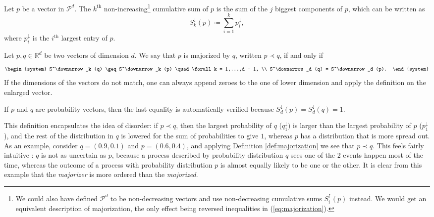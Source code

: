 \begin{definition}[Cumulative sum] %
    Let $p$ be a vector in $\mathcal{P}^d$. The $k^{\text{th}}$ non-increasing\footnote{We could also have defined $\mathcal{P}^d$ to be non-decreasing vectors and use non-decreasing cumulative sums $S^\uparrow_i (p)$ instead. We would get an equivalent description of majorization, the only effect being reversed inequalities in (\ref{eq:majorization}).} cumulative sum of $p$ is the sum of the $j$ biggest components of $p$, which can be written as
    \begin{equation}
        S^\downarrow_k (p) \coloneqq \sum_{i = 1}^{k} p^\downarrow_i,
    \end{equation}
    where $p^\downarrow_i$ is the $i^{\text{th}}$ largest entry of $p$. 

\end{definition}
\begin{definition} \label{def:majorization}
    Let $p, q \in \mathbb{R}^d$ be two vectors of dimension $d$. We say that $p$ is majorized by $q$, written $p \prec q$, if and only if
    \begin{equation} \label{eq:majorization}
        \begin{system}
            S^\downarrow_k (q) \geq S^\downarrow_k (p) \quad \forall k = 1,...,d - 1, \\
            S^\downarrow_d (q) = S^\downarrow_d (p).
        \end{system}
    \end{equation}
If the dimensions of the vectors do not match, one can always append zeroes to the one of lower dimension and apply the definition on the enlarged vector.
\end{definition}

\begin{remark}
    If $p$ and $q$ are probability vectors, then the last equality is automatically verified because $S^\downarrow_d (p) = S^\downarrow_d (q) = 1$.
\end{remark}

This definition encapsulates the idea of disorder: if $p \prec q$, then the largest probability of $q$ ($q_1^\downarrow)$ is larger than the largest probability of $p$ ($p_1^\downarrow$), and the rest of the distribution in $q$ is lowered for the sum of probabilities to give $1$, whereas $p$ has a distribution that is more spread out. As an example, consider $q = (0.9, 0.1)$ and $p = (0.6, 0.4)$, and applying Definition \ref{def:majorization} we see that $p \prec q$. This feels fairly intuitive : $q$ is not as uncertain as $p$, because a process described by probability distribution $q$ sees one of the 2 events happen most of the time, whereas the outcome of a process with probability distribution $p$ is almost equally likely to be one or the other. It is clear from this example that the \textit{majorizer} is more ordered than the \textit{majorized}.

